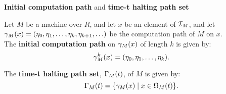 
    
    
    


  
  \begin{definition}{\textbf{Initial computation path} and \textbf{time-t halting path set}}

    Let $M$ be a machine over $R$, and let $x$ be an element of
    $\mathcal{I}_M$, and let $\gamma_M(x) = (\eta_0, \eta_1, \ldots,
    \eta_k, \eta_{k+1}, \ldots)$ be the computation path of $M$ on
    $x$.\\

    The \textbf{initial computation path} on $\gamma_M(x)$ of
    length $k$ is given by: 
    $$\gamma_M^k(x) = (\eta_0, \eta_1, \ldots,\eta_k).$$

    The \textbf{time-t halting path set}, $\Gamma_M(t)$, of $M$ is
    given by:
    $$\Gamma_M(t) = \{\gamma_M(x) \mid x \in \Omega_M(t)\}.$$
  \end{definition}

